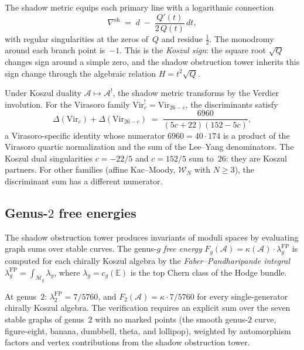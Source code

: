 \documentclass[11pt,reqno]{amsart}
\theoremstyle{definition}
\theoremstyle{remark}
\newcommand{\cA}{\mathcal{A}}
\newcommand{\cM}{\mathcal{M}}
\newcommand{\Vir}{\mathrm{Vir}}
\newcommand{\cW}{\mathcal{W}}
\numberwithin{equation}{section}
\begin{document}
The shadow metric equips each primary line with a logarithmic
connection
\begin{equation}\label{eq:intro-connection}
 \nabla^{\mathrm{sh}}
 \;=\;
 d \;-\; \frac{Q'(t)}{2\,Q(t)}\,dt,
\end{equation}
with regular singularities at the zeros of~$Q$ and residue
$\frac{1}{2}$. The monodromy around each branch point is~$-1$.
This is the \emph{Koszul sign}: the square root $\sqrt{Q}$
changes sign around a simple zero, and the shadow obstruction tower inherits
this sign change through the algebraic relation
$H = t^2\sqrt{Q}$.

Under Koszul duality $\cA \mapsto \cA^!$, the shadow metric
transforms by the Verdier involution. For the Virasoro family
$\Vir_c^! = \Vir_{26-c}$, the discriminants satisfy
\begin{equation}\label{eq:intro-disc-complementarity}
 \Delta(\Vir_c) + \Delta(\Vir_{26-c})
 \;=\;
 \frac{6960}{(5c + 22)(152 - 5c)},
\end{equation}
a Virasoro-specific identity whose numerator
$6960 = 40 \cdot 174$ is a product of the Virasoro quartic
normalization and the sum of the Lee--Yang denominators.
The Koszul dual singularities $c = -22/5$ and $c = 152/5$
sum to~$26$: they are Koszul partners. For other families
(affine Kac--Moody, $\cW_N$ with $N \ge 3$), the
discriminant sum has a different numerator.

\subsection{Genus-$2$ free energies}

The shadow obstruction tower produces invariants of moduli spaces by
evaluating graph sums over stable curves. The genus-$g$
\emph{free energy}
$F_g(\cA) = \kappa(\cA) \cdot \lambda_g^{\mathrm{FP}}$
is computed for each chirally Koszul algebra by the
\emph{Faber--Pandharipande integral}
$\lambda_g^{\mathrm{FP}} = \int_{\overline{\cM}_g} \lambda_g$,
where $\lambda_g = c_g(\mathbb{E})$ is the top Chern class
of the Hodge bundle.

At genus~$2$: $\lambda_2^{\mathrm{FP}} = 7/5760$, and
$F_2(\cA) = \kappa \cdot 7/5760$ for every single-generator
chirally Koszul algebra. The verification requires
an explicit sum over the seven stable graphs of
genus~$2$ with no marked points (the smooth genus-$2$
curve, figure-eight, banana, dumbbell, theta, and
lollipop), weighted by automorphism factors and vertex
contributions from the shadow obstruction tower.
\end{document}
